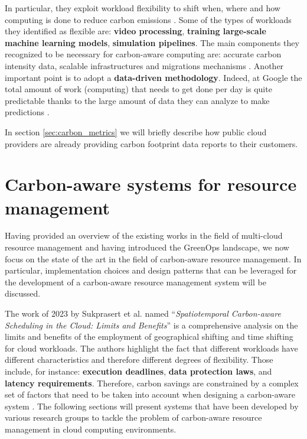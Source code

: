 In particular, they exploit workload flexibility to shift when, where and how computing is done to reduce carbon emissions \cite{google_carbon_aware_computing}.
Some of the types of workloads they identified as flexible are: \textbf{video processing}, \textbf{training large-scale machine learning models}, \textbf{simulation pipelines}.
The main components they recognized to be necessary for carbon-aware computing are: accurate carbon intensity data, scalable infrastructures and migrations mechanisms \cite{google_carbon_aware_computing}.
Another important point is to adopt a \textbf{data-driven methodology}.
Indeed, at Google the total amount of work (computing) that needs to get done per day is quite predictable thanks to the large amount of data they can analyze to make predictions \cite{google_carbon_aware_computing}.

In section \ref{sec:carbon_metrics} we will briefly describe how public cloud providers are already providing carbon footprint data reports to their customers.

\section{Carbon-aware systems for resource management}

Having provided an overview of the existing works in the field of multi-cloud resource management and having introduced the GreenOps landscape, we now focus on the state of the art in the field of carbon-aware resource management.
In particular, implementation choices and design patterns that can be leveraged for the development of a carbon-aware resource management system will be discussed.
\newline

The work of 2023 by Sukprasert et al. named ``\textit{Spatiotemporal Carbon-aware Scheduling in the Cloud: Limits and Benefits}'' \cite{10.1145/3599733.3606301} is a comprehensive analysis on the limits and benefits of the employment of geographical shifting and time shifting for cloud workloads.
The authors highlight the fact that different workloads have different characteristics and therefore different degrees of flexibility. Those include, for instance: \textbf{execution deadlines}, \textbf{data protection laws}, and \textbf{latency requirements}. Therefore, carbon savings are constrained by a complex set of factors that need to be taken into account when designing a carbon-aware system \cite{10.1145/3599733.3606301}.
The following sections will present systems that have been developed by various research groups to tackle the problem of carbon-aware resource management in cloud computing environments.

